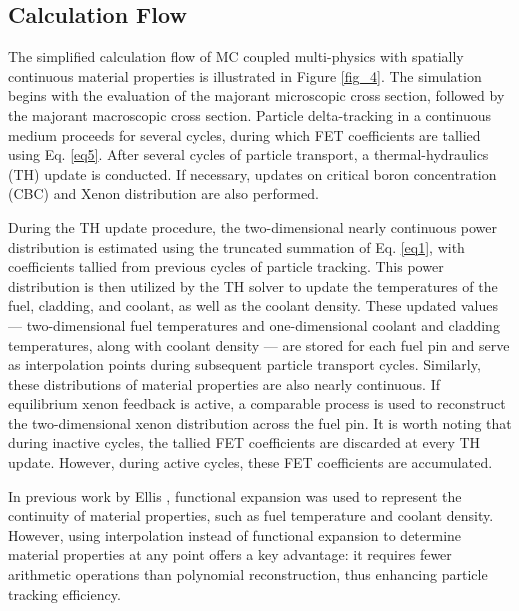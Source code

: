 \subsection{Calculation Flow} \label{sec25}

The simplified calculation flow of MC coupled multi-physics with spatially continuous material properties is illustrated in Figure \ref{fig_4}. The simulation begins with the evaluation of the majorant microscopic cross section, followed by the majorant macroscopic cross section. Particle delta-tracking in a continuous medium proceeds for several cycles, during which FET coefficients are tallied using Eq. \ref{eq5}. After several cycles of particle transport, a thermal-hydraulics (TH) update is conducted. If necessary, updates on critical boron concentration (CBC) and Xenon distribution are also performed.

During the TH update procedure, the two-dimensional nearly continuous power distribution is estimated using the truncated summation of Eq. \ref{eq1}, with coefficients tallied from previous cycles of particle tracking. This power distribution is then utilized by the TH solver to update the temperatures of the fuel, cladding, and coolant, as well as the coolant density. These updated values — two-dimensional fuel temperatures and one-dimensional coolant and cladding temperatures, along with coolant density — are stored for each fuel pin and serve as interpolation points during subsequent particle transport cycles. Similarly, these distributions of material properties are also nearly continuous. If equilibrium xenon feedback is active, a comparable process is used to reconstruct the two-dimensional xenon distribution across the fuel pin. It is worth noting that during inactive cycles, the tallied FET coefficients are discarded at every TH update. However, during active cycles, these FET coefficients are accumulated.

In previous work by Ellis \cite{ellis, ellis_2016}, functional expansion was used to represent the continuity of material properties, such as fuel temperature and coolant density. However, using interpolation instead of functional expansion to determine material properties at any point offers a key advantage: it requires fewer arithmetic operations than polynomial reconstruction, thus enhancing particle tracking efficiency.

